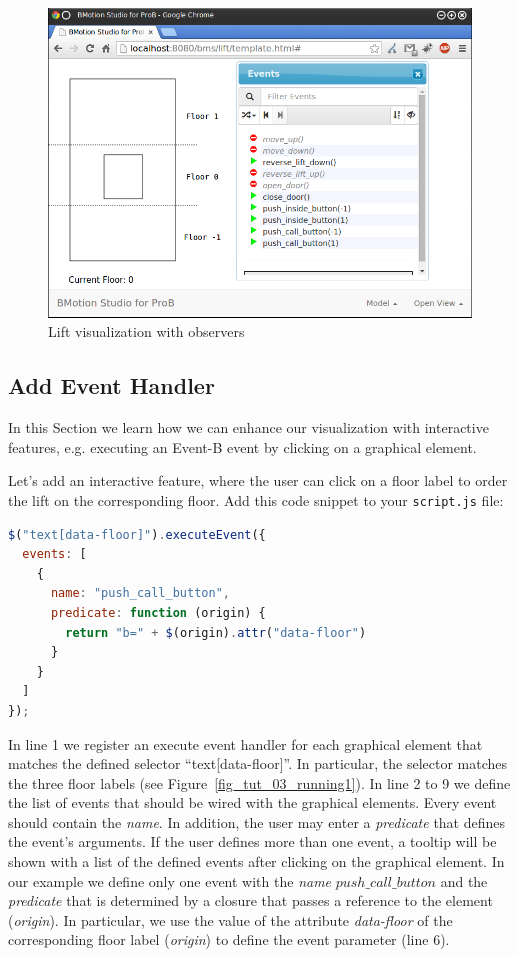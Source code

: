 \begin{figure}[!ht]
\begin{center}
	\includegraphics[width=12cm]{img/tutorial/tut_04.png}
	\caption{Lift visualization with observers}
	\label{fig_tut_04_running2}
\end{center}
\end{figure}

\subsection{Add Event Handler}

In this Section we learn how we can enhance our visualization with interactive features, e.g. executing an Event-B event by clicking on a graphical element.

Let's add an interactive feature, where the user can click on a floor label to order the lift on the corresponding floor.
Add this code snippet to your \texttt{script.js} file:
\newpage
\begin{lstlisting}[language=JavaScript, caption={Example of an Interactive Feature (JavaScript)}]
$("text[data-floor]").executeEvent({
  events: [
    {
      name: "push_call_button", 
      predicate: function (origin) {
        return "b=" + $(origin).attr("data-floor")
      }
    }
  ]
});
\end{lstlisting}

In line 1 we register an execute event handler for each graphical element that matches the defined selector ``text[data-floor]''.
In particular, the selector matches the three floor labels (see Figure~\ref{fig_tut_03_running1}).
In line 2 to 9 we define the list of events that should be wired with the graphical elements.
Every event should contain the \textit{name}.
In addition, the user may enter a \textit{predicate} that defines the event's arguments.
If the user defines more than one event, a tooltip will be shown with a list of the defined events after clicking on the graphical element.
In our example we define only one event with the \textit{name} $push\_call\_button$ and the \textit{predicate} that is determined by a closure that passes a reference to the element (\textit{origin}).
In particular, we use the value of the attribute \textit{data-floor} of the corresponding floor label (\textit{origin}) to define the event parameter (line 6).

